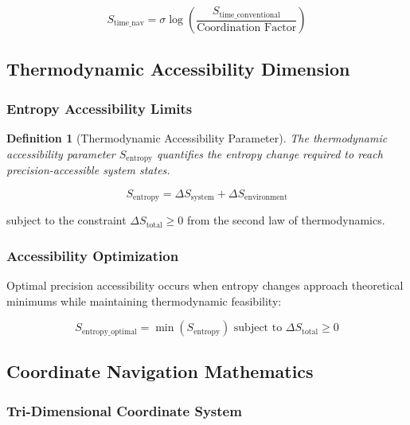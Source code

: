 \documentclass[12pt,a4paper]{article}
\newtheorem{definition}[theorem]{Definition}
\begin{document}
{{{{{{{{{{{{{\begin{equation}
S_{\text{time\_nav}} = \sigma \log\left(\frac{S_{\text{time\_conventional}}}{\text{Coordination Factor}}\right)
\label{eq:temporal_navigation}
\end{equation}

\subsection{Thermodynamic Accessibility Dimension}

\subsubsection{Entropy Accessibility Limits}

\begin{definition}[Thermodynamic Accessibility Parameter]
The thermodynamic accessibility parameter $S_{\text{entropy}}$ quantifies the entropy change required to reach precision-accessible system states.
\end{definition}

\begin{equation}
S_{\text{entropy}} = \Delta S_{\text{system}} + \Delta S_{\text{environment}}
\label{eq:thermodynamic_accessibility}
\end{equation}

subject to the constraint $\Delta S_{\text{total}} \geq 0$ from the second law of thermodynamics.

\subsubsection{Accessibility Optimization}

Optimal precision accessibility occurs when entropy changes approach theoretical minimums while maintaining thermodynamic feasibility:

\begin{equation}
S_{\text{entropy\_optimal}} = \min\left(S_{\text{entropy}}\right) \text{ subject to } \Delta S_{\text{total}} \geq 0
\label{eq:entropy_optimization}
\end{equation}

\subsection{Coordinate Navigation Mathematics}

\subsubsection{Tri-Dimensional Coordinate System}

}}}}}}}}}}}}}
\end{document}
